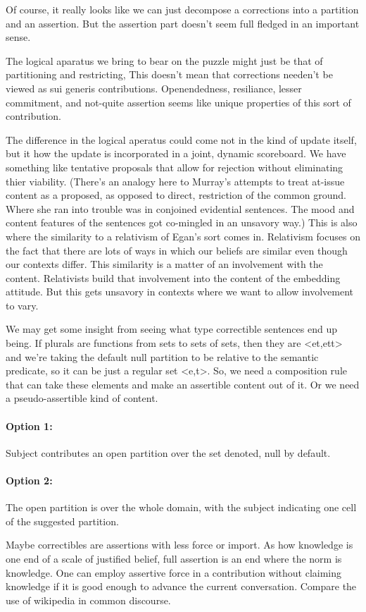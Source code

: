 \documentclass{article}
\begin{document}
Of course, it really looks like we can just decompose a corrections into a partition and an assertion.  But the assertion part doesn't seem full fledged in an important sense.

The logical aparatus we bring to bear on the puzzle might just be that of partitioning and restricting,  This doesn't mean that corrections needen't be viewed as sui generis contributions. Openendedness, resiliance, lesser commitment, and not-quite assertion seems like unique properties of this sort of contribution.

The difference in the logical aperatus could come not in the kind of update itself, but it how the update is incorporated in a joint, dynamic scoreboard.  We have something like tentative proposals that allow for rejection without eliminating thier viability. (There's an analogy here to Murray's attempts to treat at-issue content as a proposed, as opposed to direct, restriction of the common ground.  Where she ran into trouble was in conjoined evidential sentences.  The mood and content features of the sentences got co-mingled in an unsavory way.)  This is also where the similarity to a relativism of Egan's sort comes in.  Relativism focuses on the fact that there are lots of ways in which our beliefs are similar even though our contexts differ.  This similarity is a matter of an involvement with the content.  Relativists build that involvement into the content of the embedding attitude.  But this gets unsavory in contexts where we want to allow involvement to vary.

We may get some insight from seeing what type correctible sentences end up being.  If plurals are functions from sets to sets of sets, then they are <et,ett> and we're taking the default null partition to be relative to the semantic predicate, so it can be just a regular set <e,t>.  So, we need a composition rule that can take these elements and make an assertible content out of it.  Or we need a pseudo-assertible kind of content.

\paragraph{Option 1:} Subject contributes an open partition over the set denoted, null by default.

\paragraph{Option 2:} The open partition is over the whole domain, with the subject indicating one cell of the suggested partition.

Maybe correctibles are assertions with less force or import.  As how knowledge is one end of a scale of justified belief, full assertion is an end where the norm is knowledge. One can employ assertive force in a contribution without claiming knowledge if it is good enough to advance the current conversation.  Compare the use of wikipedia in common discourse.
\end{document}
